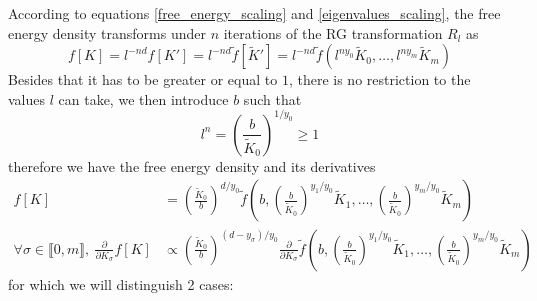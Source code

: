 \documentclass[class=report, float=false, crop=false]{standalone}
\begin{document}
According to equations \ref{free_energy_scaling} and \ref{eigenvalues_scaling}, the free energy density transforms under $n$ iterations of the RG transformation $R_l$ as
\begin{equation}
f[K] = l^{-nd} f[K'] = l^{-nd} \tilde{f}[\tilde{K}'] = l^{-nd} \tilde{f}(l^{ny_0}\tilde{K}_0,\ldots,l^{ny_m}\tilde{K}_m)
\end{equation}
Besides that it has to be greater or equal to $1$, there is no restriction to the values $l$ can take, we then introduce $b$ such that
\begin{equation}
l^n = \left(\frac{b}{\tilde{K}_0}\right)^{1/y_0} \geq 1
\label{choice_of_l}
\end{equation}
therefore we have the free energy density and its derivatives
\begin{equation}
\begin{aligned}
f[K] &= \left(\frac{\tilde{K}_0}{b}\right)^{d/y_0}\tilde{f}\left(b,\left(\frac{b}{\tilde{K}_0}\right)^{y_1/y_0}\tilde{K}_1,\ldots,\left(\frac{b}{\tilde{K}_0}\right)^{y_m/y_0}\tilde{K}_m\right)\\
\forall \sigma \in \llbracket0,m\rrbracket,~ \frac{\partial}{\partial K_{\sigma}} f[K] &\propto \left(\frac{\tilde{K}_0}{b}\right)^{(d-y_{\sigma})/y_0}\frac{\partial}{\partial K_{\sigma}}\tilde{f}\left(b,\left(\frac{b}{\tilde{K}_0}\right)^{y_1/y_0}\tilde{K}_1,\ldots,\left(\frac{b}{\tilde{K}_0}\right)^{y_m/y_0}\tilde{K}_m\right)
\label{free_energy_der_scaling}
\end{aligned}
\end{equation}
for which we will distinguish 2 cases:
\end{document}
